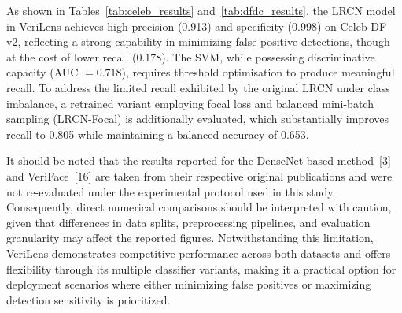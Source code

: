 

As shown in Tables~\ref{tab:celeb_results} and~\ref{tab:dfdc_results}, the LRCN model in VeriLens achieves high precision (0.913) and specificity (0.998) on Celeb-DF v2, reflecting a strong capability in minimizing false positive detections, though at the cost of lower recall (0.178). The SVM, while possessing discriminative capacity (AUC $= 0.718$), requires threshold optimisation to produce meaningful recall. To address the limited recall exhibited by the original LRCN under class imbalance, a retrained variant employing focal loss and balanced mini-batch sampling (LRCN-Focal) is additionally evaluated, which substantially improves recall to 0.805 while maintaining a balanced accuracy of 0.653.

It should be noted that the results reported for the DenseNet-based method~{[}3{]} and VeriFace~{[}16{]} are taken from their respective original publications and were not re-evaluated under the experimental protocol used in this study. Consequently, direct numerical comparisons should be interpreted with caution, given that differences in data splits, preprocessing pipelines, and evaluation granularity may affect the reported figures. Notwithstanding this limitation, VeriLens demonstrates competitive performance across both datasets and offers flexibility through its multiple classifier variants, making it a practical option for deployment scenarios where either minimizing false positives or maximizing detection sensitivity is prioritized.




